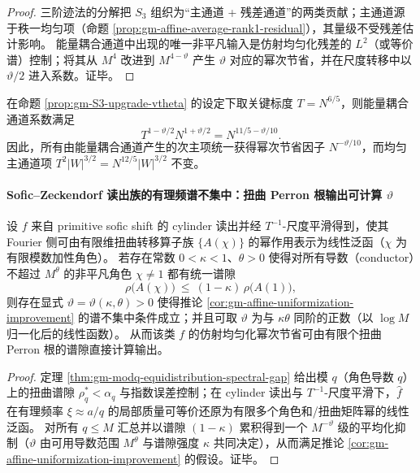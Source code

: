 \begin{proof}
三阶迹法的分解把 \(S_3\) 组织为“主通道 + 残差通道”的两类贡献；主通道源于秩一均匀项（命题 \ref{prop:gm-affine-average-rank1-residual}），其量级不受残差估计影响。
能量耦合通道中出现的唯一非平凡输入是仿射均匀化残差的 \(L^2\)（或等价谱）控制；将其从 \(M^4\) 改进到 \(M^{4-\vartheta}\) 产生 \(\vartheta\) 对应的幂次节省，并在尺度转移中以 \(\vartheta/2\) 进入系数。证毕。
\end{proof}

\begin{corollary}[能量区间的可核验幂次节省：\texorpdfstring{$T=N^{6/5}$}{T=N^{6/5}} 标度下出现 \texorpdfstring{$N^{-\vartheta/10}$}{N^{-vtheta/10}} 因子]\label{cor:gm-energy-window-saving}
在命题 \ref{prop:gm-S3-upgrade-vtheta} 的设定下取关键标度 \(T=N^{6/5}\)，则能量耦合通道系数满足
\[
T^{1-\vartheta/2}N^{1+\vartheta/2}=N^{11/5-\vartheta/10}.
\]
因此，所有由能量耦合通道产生的次主项统一获得幂次节省因子 \(N^{-\vartheta/10}\)，而均匀主通道项 \(T^2|W|^{3/2}=N^{12/5}|W|^{3/2}\) 不变。
\end{corollary}

\paragraph{Sofic--Zeckendorf 读出族的有理频谱不集中：扭曲 Perron 根输出可计算 \texorpdfstring{$\vartheta$}{vtheta}}
\begin{theorem}\label{thm:gm-sofic-rational-nonconcentration-vtheta}
设 \(f\) 来自 primitive sofic shift 的 cylinder 读出并经 \(T^{-1}\)-尺度平滑得到，使其 Fourier 侧可由有限维扭曲转移算子族 \(\{A(\chi)\}\) 的幂作用表示为线性泛函（\(\chi\) 为有限模数加性角色）。
若存在常数 \(0<\kappa<1\)、\(\theta>0\) 使得对所有导数（conductor）不超过 \(M^\theta\) 的非平凡角色 \(\chi\ne 1\) 都有统一谱隙
\[
\rho\!\bigl(A(\chi)\bigr)\ \le\ (1-\kappa)\,\rho\!\bigl(A(1)\bigr),
\]
则存在显式 \(\vartheta=\vartheta(\kappa,\theta)>0\) 使得推论 \ref{cor:gm-affine-uniformization-improvement} 的谱不集中条件成立；并且可取 \(\vartheta\) 为与 \(\kappa\theta\) 同阶的正数（以 \(\log M\) 归一化后的线性函数）。
从而该类 \(f\) 的仿射均匀化幂次节省可由有限个扭曲 Perron 根的谱隙直接计算输出。
\end{theorem}

\begin{proof}
定理 \ref{thm:gm-modq-equidistribution-spectral-gap} 给出模 \(q\)（角色导数 \(q\)）上的扭曲谱隙 \(\rho_q^\ast<\alpha_q\) 与指数误差控制；在 cylinder 读出与 \(T^{-1}\)-尺度平滑下，\(\widehat f\) 在有理频率 \(\xi\approx a/q\) 的局部质量可等价还原为有限多个角色和/扭曲矩阵幂的线性泛函。
对所有 \(q\le M\) 汇总并以谱隙 \((1-\kappa)\) 累积得到一个 \(M^{-\vartheta}\) 级的平均化抑制（\(\vartheta\) 由可用导数范围 \(M^\theta\) 与谱隙强度 \(\kappa\) 共同决定），从而满足推论 \ref{cor:gm-affine-uniformization-improvement} 的假设。证毕。
\end{proof}


